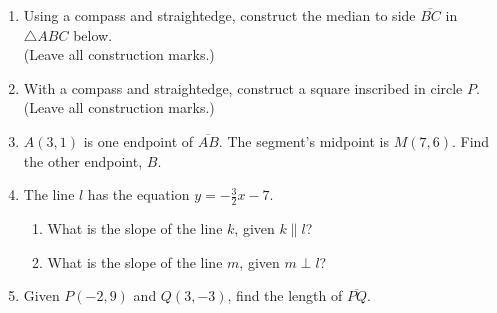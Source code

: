 \documentclass[12pt, twoside]{article}
\begin{document}
\begin{enumerate}
\newpage

    \item Using  a  compass  and  straightedge,  construct  the  median  to  side $\overline{BC}$ in $\triangle ABC$ below.\\ (Leave all construction marks.)
      \vspace{1cm}
    \begin{center}
    \end{center}

      \vspace{2cm}

    \item With a compass and straightedge, construct a square inscribed in circle $P$. (Leave all construction marks.)
      \vspace{1cm}
      \begin{center}
      \end{center}

\newpage

    \item $A(3,1)$ is one endpoint of $\overline{AB}$. The segment's midpoint is $M(7,6)$. Find the other endpoint, $B$. \vspace{5cm}

    \item The line $l$ has the equation $y=-\frac{3}{2} x-7$.
      \begin{enumerate}
        \item What is the slope of the line $k$, given $k \parallel l$?
        \vspace{1.5cm}
        \item What is the slope of the line $m$, given $m \perp l$?
        \vspace{2.5cm}
      \end{enumerate}

    \item Given $P(-2,9)$ and $Q(3,-3)$, find the length of $\overline{PQ}$.
        \vspace{4cm}


\end{enumerate}
\end{document}
